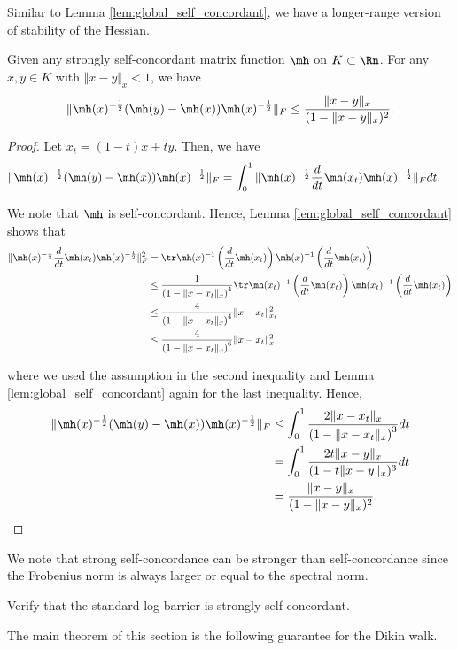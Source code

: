 Similar to Lemma \ref{lem:global_self_concordant}, we have a longer-range
version of stability of the Hessian.
\begin{lem}
\label{lem:global_strongly_self_concordant}Given any strongly self-concordant
matrix function $\mh$ on $K\subset\Rn$. For any $x,y\in K$ with
$\Vert x-y\Vert_{x}<1$, we have
\[
\|\mh(x)^{-\frac{1}{2}}(\mh(y)-\mh(x))\mh(x)^{-\frac{1}{2}}\|_{F}\leq\frac{\|x-y\|_{x}}{(1-\|x-y\|_{x})^{2}}.
\]
\end{lem}

\begin{proof}
Let $x_{t}=(1-t)x+ty$. Then, we have
\begin{align*}
\|\mh(x)^{-\frac{1}{2}}(\mh(y)-\mh(x))\mh(x)^{-\frac{1}{2}}\|_{F} & =\int_{0}^{1}\|\mh(x)^{-\frac{1}{2}}\frac{d}{dt}\mh(x_{t})\mh(x)^{-\frac{1}{2}}\|_{F}dt.
\end{align*}

We note that $\mh$ is self-concordant. Hence, Lemma \ref{lem:global_self_concordant}
shows that
\begin{align*}
\|\mh(x)^{-\frac{1}{2}}\frac{d}{dt}\mh(x_{t})\mh(x)^{-\frac{1}{2}}\|_{F}^{2} & =\tr\mh(x)^{-1}\left(\frac{d}{dt}\mh(x_{t})\right)\mh(x)^{-1}\left(\frac{d}{dt}\mh(x_{t})\right)\\
 & \leq\frac{1}{\left(1-\Vert x-x_{t}\Vert_{x}\right)^{4}}\tr\mh(x_{t})^{-1}\left(\frac{d}{dt}\mh(x_{t})\right)\mh(x_{t})^{-1}\left(\frac{d}{dt}\mh(x_{t})\right)\\
 & \leq\frac{4}{\left(1-\Vert x-x_{t}\Vert_{x}\right)^{4}}\|x-x_{t}\|_{x_{t}}^{2}\\
 & \leq\frac{4}{\left(1-\Vert x-x_{t}\Vert_{x}\right)^{6}}\|x-x_{t}\|_{x}^{2}
\end{align*}

where we used the assumption in the second inequality and Lemma \ref{lem:global_self_concordant}
again for the last inequality. Hence, 
\begin{align*}
\|\mh(x)^{-\frac{1}{2}}(\mh(y)-\mh(x))\mh(x)^{-\frac{1}{2}}\|_{F} & \leq\int_{0}^{1}\frac{2\|x-x_{t}\|_{x}}{\left(1-\Vert x-x_{t}\Vert_{x}\right)^{3}}dt\\
 & =\int_{0}^{1}\frac{2t\|x-y\|_{x}}{(1-t\|x-y\|_{x})^{3}}dt\\
 & =\frac{\|x-y\|_{x}}{(1-\|x-y\|_{x})^{2}}.
\end{align*}
\end{proof}
We note that strong self-concordance can be stronger than self-concordance
since the Frobenius norm is always larger or equal to the spectral
norm. 
\begin{xca}
Verify that the standard log barrier is strongly self-concordant.

The main theorem of this section is the following guarantee for the
Dikin walk.
\end{xca}

